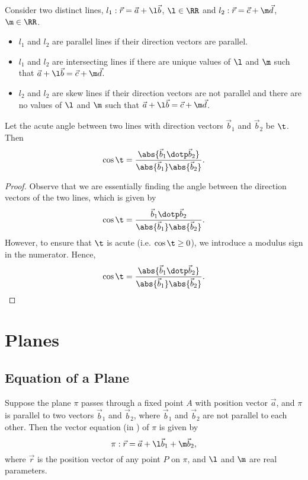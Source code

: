 \begin{recipe}
    Consider two distinct lines, $l_1 : \vec r = \vec a + \l \vec b$, $\l \in \RR$ and $l_2 : \vec r = \vec c + \m \vec d$, $\m \in \RR$.
    \begin{itemize}
        \item $l_1$ and $l_2$ are parallel lines if their direction vectors are parallel.
        \item $l_1$ and $l_2$ are intersecting lines if there are unique values of $\l$ and $\m$ such that $\vec a + \l \vec b = \vec c + \m \vec d$.
        \item $l_2$ and $l_2$ are skew lines if their direction vectors are not parallel and there are no values of $\l$ and $\m$ such that $\vec a + \l \vec b = \vec c + \m \vec d$.
    \end{itemize}
\end{recipe}

\begin{proposition}
    Let the acute angle between two lines with direction vectors $\vec b_1$ and $\vec b_2$ be $\t$. Then \[\cos\t = \frac{\abs{\vec b_1 \dotp \vec b_2}}{\abs{\vec b_1} \abs{\vec b_2}}.\]
\end{proposition}
\begin{proof}
    Observe that we are essentially finding the angle between the direction vectors of the two lines, which is given by \[\cos\t = \frac{\vec b_1 \dotp \vec b_2}{\abs{\vec b_1} \abs{\vec b_2}}.\] However, to ensure that $\t$ is acute (i.e. $\cos \t \geq 0$), we introduce a modulus sign in the numerator. Hence, \[\cos\t = \frac{\abs{\vec b_1 \dotp \vec b_2}}{\abs{\vec b_1} \abs{\vec b_2}}.\]
\end{proof}

\section{Planes}


\subsection{Equation of a Plane}

\begin{definition}
    Suppose the plane $\pi$ passes through a fixed point $A$ with position vector $\vec a$, and $\pi$ is parallel to two vectors $\vec b_1$ and $\vec b_2$, where $\vec b_1$ and $\vec b_2$ are not parallel to each other. Then the vector equation (in ) of $\pi$ is given by \[\pi : \vec r = \vec a + \l \vec b_1 + \m \vec b_2,\] where $\vec r$ is the position vector of any point $P$ on $\pi$, and $\l$ and $\m$ are real parameters.
\end{definition}

